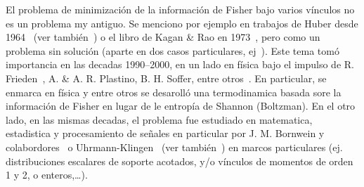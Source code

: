 El  problema  de  minimizaci\'on  de  la informaci\'on  de  Fisher  bajo  varios
v\'inculos no es un problema my antiguo.  Se menciono por ejemplo en trabajos de
Huber  desde  1964~\cite{Hub64}  (ver  tambi\'en~\cite{Hub92})  o  el  libro  de
Kagan \&  Rao en 1973~\cite[Cap.~13  y p.~465]{KagLin73}, pero como  un problema
sin  soluci\'on (aparte  en  dos casos  particulares, ej~\cite{KagLin73,  Bic81,
BicCol83}).  Este tema tom\'o importancia en  las decadas 1990--2000, en un lado
en  f\'isica  bajo  el  impulso  de R.   Frieden~\cite{Fri89},  A.   \&  A.   R.
Plastino, B.   H.  Soffer,  entre otros~\cite{Fri89, Fri90,  FriSof95, FriPla99,
FriPla02, Fri98, Fri04}.  En particular, se enmarca en f\'isica y entre otros se
desaroll\'o una termodinamica basada sore la informaci\'on de Fisher en lugar de
le entrop\'ia de Shannon (Boltzman). En el  otro lado, en las mismas decadas, el
problema fue estudiado  en matematica, estadistica y  procesamiento de se\~nales
en particular  por J.  M.   Bornwein y colabordores~\cite{BorLew96,  BorLew95} o
Uhrmann-Klingen~\cite{Uhr92,  Uhr95} (ver  tambi\'en~\cite{Ziv98, BerVig09})  en
marcos  particulares (ej.   distribuciones  escalares de  soporte acotados,  y/o
v\'inculos de momentos de orden 1 y 2, o enteros,\ldots).



